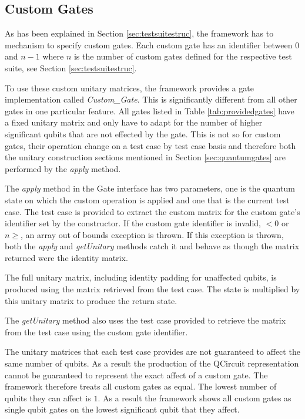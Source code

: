 \subsection{Custom Gates}
\label{sec:custgates}

As has been explained in Section \ref{sec:testsuitestruc}, the framework has to mechanism to specify custom gates.
Each custom gate has an identifier between $0$ and $n-1$ where $n$ is the number of custom gates defined for the respective test suite, see Section \ref{sec:testsuitestruc}.

To use these custom unitary matrices, the framework provides a gate implementation called \emph{Custom\_Gate}.
This is significantly different from all other gates in one particular feature.
All gates listed in Table \ref{tab:providedgates} have a fixed unitary matrix and only have to adapt for the number of higher significant qubits that are not effected by the gate.
This is not so for custom gates, their operation change on a test case by test case basis and therefore both the unitary construction sections mentioned in Section \ref{sec:quantumgates} are performed by the \emph{apply} method.

The \emph{apply} method in the Gate interface has two parameters, one is the quantum state on which the custom operation is applied and one that is the current test case.
The test case is provided to extract the custom matrix for the custom gate's identifier set by the constructor.
If the custom gate identifier is invalid, $<0$ or $n\geq$, an array out of bounds exception is thrown.
If this exception is thrown, both the \emph{apply} and \emph{getUnitary} methods catch it and behave as though the matrix returned were the identity matrix.

The full unitary matrix, including identity padding for unaffected qubits, is produced using the matrix retrieved from the test case.
The state is multiplied by this unitary matrix to produce the return state.

The \emph{getUnitary} method also uses the test case provided to retrieve the matrix from the test case using the custom gate identifier.

The unitary matrices that each test case provides are not guaranteed to affect the same number of qubits.
As a result the production of the QCircuit\cite{QCsite} representation cannot be guaranteed to represent the exact affect of a custom gate.
The framework therefore treats all custom gates as equal.
The lowest number of qubits they can affect is $1$.
As a result the framework shows all custom gates as single qubit gates on the lowest significant qubit that they affect.


